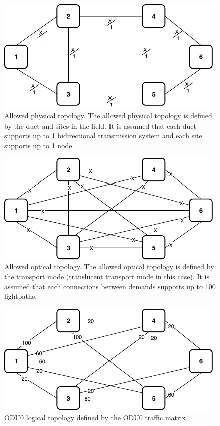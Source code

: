 \begin{figure}[h!]
\centering
\includegraphics[width=11cm]{sdf/ilp/translucent_survivability/figures/allowed_physical_topology}
\caption{Allowed physical topology. The allowed physical topology is defined by the duct and sites in the field. It is assumed that each duct supports up to 1 bidirectional transmission system and each site supports up to 1 node.}
\label{allowed3_physical_high}
\end{figure}

\newpage
\begin{figure}[h!]
\centering
\includegraphics[width=11cm]{sdf/ilp/translucent_survivability/figures/allowed_optical_topology}
\caption{Allowed optical topology. The allowed optical topology is defined by the transport mode (translucent transport mode in this case). It is assumed that each connections between demands supports up to 100 lightpaths.}
\label{allowed3_optical_high}
\end{figure}

\begin{figure}[h!]
\centering
\includegraphics[width=11cm]{sdf/ilp/translucent_survivability/figures/logical_topology_ODU0_high}
\caption{ODU0 logical topology defined by the ODU0 traffic matrix.}
\label{logical3_ODU0_high}
\end{figure}

